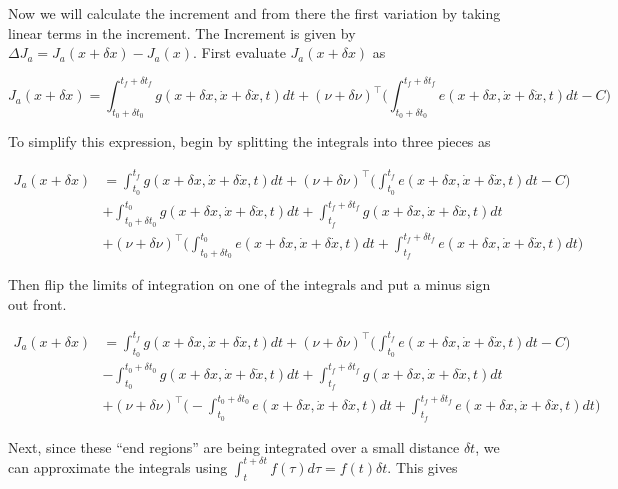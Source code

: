 \documentclass[11pt,letterpaper,onecolumn,notitlepage]{article}
\begin{document}
  Now we will calculate the increment and from there the first variation by taking linear terms in the increment.
  The Increment is given by $\Delta J_{a}=J_{a}(x+\delta x)-J_{a}(x)$.
  First evaluate $J_{a}(x+\delta x)$ as

  \begin{equation*}
    J_{a}(x+\delta x)=
    \int_{t_{0}+\delta t_{0}}^{t_{f}+\delta t_{f}}g(x+\delta x,\dot{x}+\delta\dot{x},t)dt+(\nu+\delta\nu)^{\top}\biggr(\int_{t_{0}+\delta t_{0}}^{t_{f}+\delta t_{f}}e(x+\delta x,\dot{x}+\delta\dot{x},t)dt-C\biggr)
  \end{equation*}

  To simplify this expression, begin by splitting the integrals into three pieces as

  \begin{align*}
    J_{a}(x+\delta x)&=
    \int_{t_{0}}^{t_{f}}g(x+\delta x,\dot{x}+\delta\dot{x},t)dt
    +(\nu+\delta\nu)^{\top}\biggr(\int_{t_{0}}^{t_{f}}e(x+\delta x,\dot{x}+\delta\dot{x},t)dt-C\biggr) \\
    &+
    \int_{t_{0}+\delta t_{0}}^{t_{0}}g(x+\delta x,\dot{x}+\delta\dot{x},t)dt+
    \int_{t_{f}}^{t_{f}+\delta t_{f}}g(x+\delta x,\dot{x}+\delta\dot{x},t)dt \\
    &+(\nu+\delta\nu)^{\top}\biggr(
    \int_{t_{0}+\delta t_{0}}^{t_{0}}e(x+\delta x,\dot{x}+\delta\dot{x},t)dt+
    \int_{t_{f}}^{t_{f}+\delta t_{f}}e(x+\delta x,\dot{x}+\delta\dot{x},t)dt\biggr)
  \end{align*}

  Then flip the limits of integration on one of the integrals and put a minus sign out front.

  \begin{align*}
    J_{a}(x+\delta x)&=
    \int_{t_{0}}^{t_{f}}g(x+\delta x,\dot{x}+\delta\dot{x},t)dt
    +(\nu+\delta\nu)^{\top}\biggr(\int_{t_{0}}^{t_{f}}e(x+\delta x,\dot{x}+\delta\dot{x},t)dt-C\biggr) \\
    &-
    \int_{t_{0}}^{t_{0}+\delta t_{0}}g(x+\delta x,\dot{x}+\delta\dot{x},t)dt+
    \int_{t_{f}}^{t_{f}+\delta t_{f}}g(x+\delta x,\dot{x}+\delta\dot{x},t)dt \\
    &+(\nu+\delta\nu)^{\top}\biggr(
    -\int_{t_{0}}^{t_{0}+\delta t_{0}}e(x+\delta x,\dot{x}+\delta\dot{x},t)dt+
    \int_{t_{f}}^{t_{f}+\delta t_{f}}e(x+\delta x,\dot{x}+\delta\dot{x},t)dt\biggr)
  \end{align*}

  Next, since these ``end regions'' are being integrated over a small distance $\delta t$, we can approximate the integrals using $\int_{t}^{t+\delta t}f(\tau)d\tau=f(t)\delta t$.
  This gives
\end{document}
